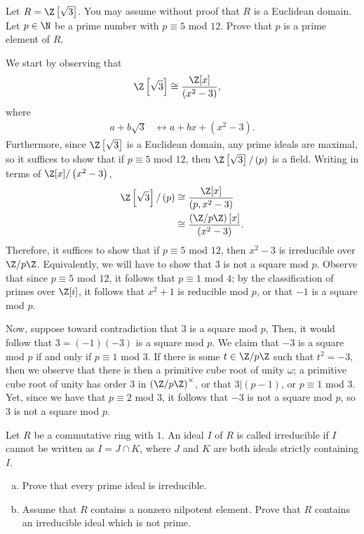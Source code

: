 \documentclass[10pt]{mypackage}
\begin{document}
\begin{problem}[Problem 3]
  Let $R = \Z\left[ \sqrt{3} \right]$. You may assume without proof that $R$ is a Euclidean domain. Let $p\in \N$ be a prime number with $p\equiv 5$ mod $12$. Prove that $p$ is a prime element of $R$.
\end{problem}
\begin{solution}
  We start by observing that
  \begin{align*}
    \Z\left[ \sqrt{3} \right] &\cong \frac{\Z[x]}{\left( x^2 - 3 \right)},
  \end{align*}
  where
  \begin{align*}
    a + b\sqrt{3} &\leftrightarrow a + bx + \left( x^2 - 3 \right).
  \end{align*}
  Furthermore, since $\Z\left[ \sqrt{3} \right]$ is a Euclidean domain, any prime ideals are maximal, so it suffices to show that if $p\equiv 5$ mod $12$, then $\Z\left[ \sqrt{3} \right]/\left( p \right)$ is a field. Writing in terms of $\Z[x]/\left( x^2-3 \right)$,
  \begin{align*}
    \Z\left[ \sqrt{3} \right]/\left( p \right) &\cong \frac{\Z[x]}{\left( p,x^2-3 \right)}\\
                                               &\cong \frac{\left( \Z/p\Z \right)[x]}{\left( x^2-3 \right)}.
  \end{align*}
  Therefore, it suffices to show that if $p\equiv 5$ mod $12$, then $x^2-3$ is irreducible over $\Z/p\Z$. Equivalently, we will have to show that $3$ is not a square mod $p$. Observe that since $p\equiv 5$ mod $12$, it follows that $p\equiv 1$ mod $4$; by the classification of primes over $\Z[i]$, it follows that $x^2 + 1$ is reducible mod $p$, or that $-1$ is a square mod $p$.

  Now, suppose toward contradiction that $3$ is a square mod $p$, Then, it would follow that $3 = \left( -1 \right)\left( -3 \right)$ is a square mod $p$. We claim that $-3$ is a square mod $p$ if and only if $p\equiv 1$ mod $3$. If there is some $t\in \Z/p\Z$ such that $t^2 = -3$, then we observe that there is then a primitive cube root of unity $\omega$; a primitive cube root of unity has order $3$ in $\left( \Z/p\Z \right)^{\times}$, or that $3 | \left( p-1 \right)$, or $p\equiv 1$ mod $3$. Yet, since we have that $p\equiv 2$ mod $3$, it follows that $-3$ is not a square mod $p$, so $3$ is not a square mod $p$.
\end{solution}
\begin{problem}[Problem 4]
  Let $R$ be a commutative ring with $1$. An ideal $I$ of $R$ is called irreducible if $I$ cannot be written as $I = J\cap K$, where $J$ and $K$ are both ideals strictly containing $I$.
  \begin{enumerate}[(a)]
    \item Prove that every prime ideal is irreducible.
    \item Assume that $R$ contains a nonzero nilpotent element. Prove that $R$ contains an irreducible ideal which is not prime.
  \end{enumerate}
\end{problem}
\end{document}
